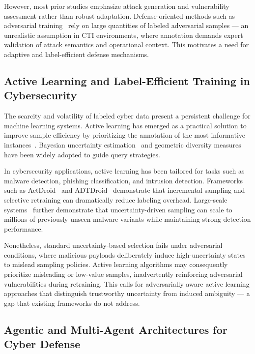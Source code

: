 \documentclass[review,1p,times,number]{elsarticle}
\begin{document}
However, most prior studies emphasize attack generation and
vulnerability assessment rather than robust adaptation.
Defense-oriented methods such as adversarial
training~\cite{madry2018towards} rely on large quantities of labeled
adversarial samples — an unrealistic assumption in CTI environments,
where annotation demands expert validation of attack semantics and
operational context. This motivates a need for adaptive and
label-efficient defense mechanisms.

\subsection{Active Learning and Label-Efficient Training in
Cybersecurity}

The scarcity and volatility of labeled cyber data present a persistent
challenge for machine learning systems. Active learning has emerged as
a practical solution to improve sample efficiency by prioritizing the
annotation of the most informative instances~\cite{settles2009active,
gal2017deep}. Bayesian uncertainty estimation~\cite{gal2017deep} and
geometric diversity measures have been widely adopted to guide query
strategies.

In cybersecurity applications, active learning has been tailored for
tasks such as malware detection, phishing classification, and intrusion
detection. Frameworks such as ActDroid~\cite{muzaffar2026actdroid} and
ADTDroid~\cite{liu2026adtdroid} demonstrate that incremental sampling
and selective retraining can dramatically reduce labeling overhead.
Large-scale systems~\cite{bensaoud2025active} further demonstrate that
uncertainty-driven sampling can scale to millions of previously unseen
malware variants while maintaining strong detection performance.

Nonetheless, standard uncertainty-based selection fails under
adversarial conditions, where malicious payloads deliberately induce
high-uncertainty states to mislead sampling policies. Active learning
algorithms may consequently prioritize misleading or low-value samples,
inadvertently reinforcing adversarial vulnerabilities during retraining.
This calls for adversarially aware active learning approaches that
distinguish trustworthy uncertainty from induced ambiguity — a gap that
existing frameworks do not address.

\subsection{Agentic and Multi-Agent Architectures for Cyber Defense}
\end{document}

